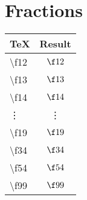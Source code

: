 \documentclass{article}
\begin{document}
\section{Fractions}

\begin{table}[!ht]
  \begin{tabular}{l|c}
    TeX & Result \\
    \hline
    \textbackslash f12 & $\f12$ \\
    \textbackslash f13 & $\f13$ \\
    \textbackslash f14 & $\f14$ \\
    \vdots             & \vdots \\
    \textbackslash f19 & $\f19$ \\
    \textbackslash f34 & $\f34$ \\
    \textbackslash f54 & $\f54$ \\
    \textbackslash f99 & $\f99$ \\
  \end{tabular}
\end{table}
\end{document}
